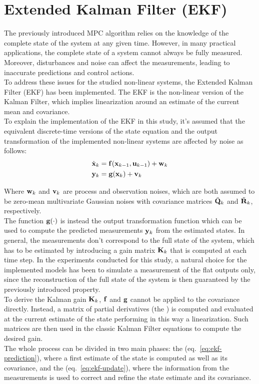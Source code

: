 \documentclass[../main.tex]{subfiles}
\begin{document}
\section{Extended Kalman Filter (EKF)}\label{sec:ekf}

The previously introduced MPC algorithm relies on the knowledge of the complete
state of the system at any given time. However, in many practical applications,
the complete state of a system cannot always be fully measured. Moreover,
disturbances and noise can affect the measurements, leading to inaccurate
predictions and control actions.\\
To address these issues for the studied non-linear systems, the Extended Kalman
Filter (EKF) has been implemented. The EKF is the non-linear version of the
Kalman Filter, which implies linearization around an estimate of the current
mean and covariance.\\
To explain the implementation of the EKF in this study, it's assumed that the
equivalent discrete-time versions of the state equation and the output
transformation of the implemented non-linear systems are affected by noise as
follows:
\begin{equation}
  \begin{aligned}
	  \dot{\mathbf{x}}_k &= \mathbf{f}(\mathbf{x}_{k-1}, \mathbf{u}_{k-1}) + \mathbf{w}_k \\
	  \mathbf{y}_k &= \mathbf{g}(\mathbf{x}_k) + \mathbf{v}_k
  \end{aligned}
\end{equation}

Where $\mathbf{w}_k$ and $\mathbf{v}_k$ are process and observation noises, which
are both assumed to be zero-mean multivariate Gaussian noises with covariance
matrices $\tilde{\mathbf{Q}}_k$ and $\tilde{\mathbf{R}}_k$, respectively.\\
The function $\mathbf{g}(\cdot)$ is instead the output transformation function
which can be used to compute the predicted measurements $\mathbf{y}_k$ from the estimated
states. In general, the measurements don't correspond to the full state of the
system, which has to be estimated by introducing a gain matrix $\mathbf{K}_k$ that
is computed at each time step.
In the experiments conducted for this study, a natural choice for the
implemented models has been to simulate a measurement of the flat outputs only,
since the reconstruction of the full state of the system is then guaranteed by the
previously introduced  property.\\
To derive the Kalman gain $\mathbf{K}_k$, $\mathbf{f}$ and $\mathbf{g}$
cannot be applied to the covariance directly. Instead, a matrix of partial
derivatives (the ) is computed and evaluated at the current
estimate of the state performing in this way a linearization. Such matrices are then used in the
classic Kalman Filter equations to compute the desired gain.\\
The whole process can be divided in two main phases: the 
(eq.~\ref{eq:ekf-prediction}), where a first estimate of the state is computed
as well as its covariance, and the  (eq.~\ref{eq:ekf-update}),
where the information from the measurements is used to correct and refine the state
estimate and its covariance.
\end{document}
